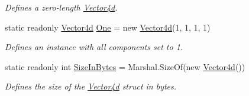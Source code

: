 \begin{DoxyCompactItemize}
\begin{DoxyCompactList}\small\item\em Defines a zero-\/length \hyperlink{struct_open_t_k_1_1_vector4d}{Vector4d}. \end{DoxyCompactList}\item 
static readonly \hyperlink{struct_open_t_k_1_1_vector4d}{Vector4d} \hyperlink{struct_open_t_k_1_1_vector4d_a2ab9387d42b63eb49972733a69e34ff3}{One} = new \hyperlink{struct_open_t_k_1_1_vector4d}{Vector4d}(1, 1, 1, 1)
\begin{DoxyCompactList}\small\item\em Defines an instance with all components set to 1. \end{DoxyCompactList}\item 
static readonly int \hyperlink{struct_open_t_k_1_1_vector4d_a9e70f61574922798bf2ff182ffc82cb5}{Size\-In\-Bytes} = Marshal.\-Size\-Of(new \hyperlink{struct_open_t_k_1_1_vector4d}{Vector4d}())
\begin{DoxyCompactList}\small\item\em Defines the size of the \hyperlink{struct_open_t_k_1_1_vector4d}{Vector4d} struct in bytes. \end{DoxyCompactList}\end{DoxyCompactItemize}
